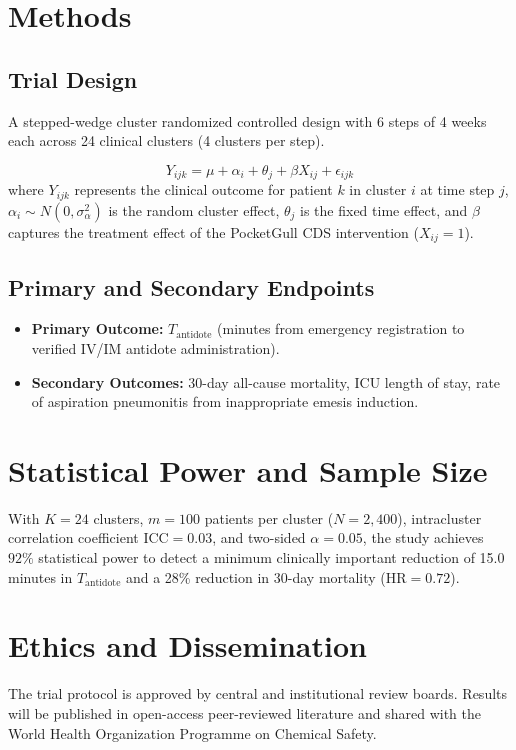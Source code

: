 \documentclass[11pt,a4paper]{article}
\begin{document}
\section{Methods}
\subsection{Trial Design}
A stepped-wedge cluster randomized controlled design with 6 steps of 4 weeks each across 24 clinical clusters (4 clusters per step).

\begin{equation}
Y_{ijk} = \mu + \alpha_i + \theta_j + \beta X_{ij} + \epsilon_{ijk}
\end{equation}
where $Y_{ijk}$ represents the clinical outcome for patient $k$ in cluster $i$ at time step $j$, $\alpha_i \sim N(0, \sigma_\alpha^2)$ is the random cluster effect, $\theta_j$ is the fixed time effect, and $\beta$ captures the treatment effect of the PocketGull CDS intervention ($X_{ij} = 1$).

\subsection{Primary and Secondary Endpoints}
\begin{itemize}
    \item \textbf{Primary Outcome:} $T_{\text{antidote}}$ (minutes from emergency registration to verified IV/IM antidote administration).
    \item \textbf{Secondary Outcomes:} 30-day all-cause mortality, ICU length of stay, rate of aspiration pneumonitis from inappropriate emesis induction.
\end{itemize}

\section{Statistical Power and Sample Size}
With $K = 24$ clusters, $m = 100$ patients per cluster ($N = 2,400$), intracluster correlation coefficient $\text{ICC} = 0.03$, and two-sided $\alpha = 0.05$, the study achieves $92\%$ statistical power to detect a minimum clinically important reduction of 15.0 minutes in $T_{\text{antidote}}$ and a 28\% reduction in 30-day mortality ($\text{HR} = 0.72$).

\section{Ethics and Dissemination}
The trial protocol is approved by central and institutional review boards. Results will be published in open-access peer-reviewed literature and shared with the World Health Organization Programme on Chemical Safety.
\end{document}
